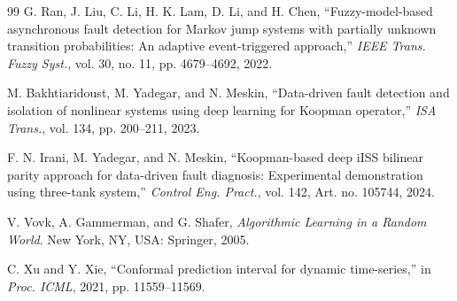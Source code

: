 \documentclass[journal]{IEEEtran}
\newcommand{\1}{\bm 1}
\begin{document}
\begin{thebibliography}{99}
G. Ran, J. Liu, C. Li, H. K. Lam, D. Li, and H. Chen,
``Fuzzy-model-based asynchronous fault detection for Markov jump systems
with partially unknown transition probabilities: An adaptive event-triggered
approach,'' \emph{IEEE Trans. Fuzzy Syst.}, vol. 30, no. 11,
pp. 4679--4692, 2022.

M. Bakhtiaridoust, M. Yadegar, and N. Meskin, ``Data-driven fault detection
and isolation of nonlinear systems using deep learning for Koopman operator,''
\emph{ISA Trans.}, vol. 134, pp. 200--211, 2023.

F. N. Irani, M. Yadegar, and N. Meskin, ``Koopman-based deep iISS bilinear
parity approach for data-driven fault diagnosis: Experimental demonstration
using three-tank system,'' \emph{Control Eng. Pract.}, vol. 142,
Art. no. 105744, 2024.

V. Vovk, A. Gammerman, and G. Shafer,
\emph{Algorithmic Learning in a Random World}. New York, NY, USA: Springer,
2005.

C. Xu and Y. Xie, ``Conformal prediction interval for dynamic time-series,''
in \emph{Proc. ICML}, 2021, pp. 11559--11569.
\end{thebibliography}
\end{document}
